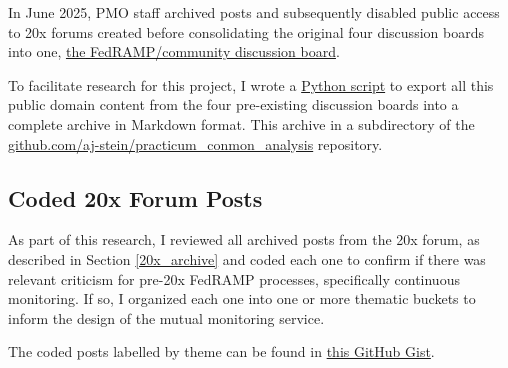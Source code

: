 \documentclass{jdf}
\begin{document}
In June 2025, PMO staff archived posts and subsequently disabled public access to 20x forums created before consolidating the original four discussion boards into one, \href{https://github.com/FedRAMP/community/discussions}{the FedRAMP/community discussion board}.

To facilitate research for this project, I wrote a \href{https://github.com/aj-stein/practicum_conmon_analysis/blob/e0baba42dda242b137fa7ab583a3ceaecaf1e94f/src/download_discussions.py}{Python script} to export all this public domain content from the four pre-existing discussion boards into a complete archive in Markdown format. This archive in a subdirectory of the \href{https://github.com/aj-stein/practicum\_conmon\_analysis/tree/e0baba42dda242b137fa7ab583a3ceaecaf1e94f/data/fedramp}{github.com/aj-stein/practicum\_conmon\_analysis} repository.

\subsection{Coded 20x Forum Posts} \label{20x_archive_coded}

As part of this research, I reviewed all archived posts from the 20x forum, as described in Section \ref{20x_archive} and coded each one to confirm if there was relevant criticism for pre-20x FedRAMP processes, specifically continuous monitoring. If so, I organized each one into one or more thematic buckets to inform the design of the mutual monitoring service.

The coded posts labelled by theme can be found in \href{https://gist.github.com/aj-stein/ffa8bdbe5674a59159d4850aa16fb142}{this GitHub Gist}.
\end{document}
